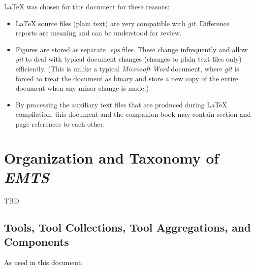 \LaTeX{} was chosen for this document for these reasons:

\begin{itemize}
   \item \LaTeX{} source files (plain text) are very compatible with \emph{git}.
         Difference reports are meaning and can be understood for review.
   \item Figures are stored as separate \emph{.eps} files.
         These change infrequently and allow \emph{git} to deal with typical document changes
         (changes to plain text files only) efficiently.  (This is unlike a typical
         \emph{Microsoft Word} document, where
         \emph{git} is forced to treat the document as binary and store a new copy of the entire
         document when any minor change is made.)
   \item By processing the auxiliary text files that are produced during 
         \LaTeX{} compilation, this document and the companion book may contain section
         and page references to each other.
\end{itemize}

\section{Organization and Taxonomy of \emph{EMTS}}
\label{ciov2:sote0}

TBD.


\subsection{Tools, Tool Collections, Tool Aggregations, and Components}
\label{ciov2:sote0:snom0}

As used in this document:

